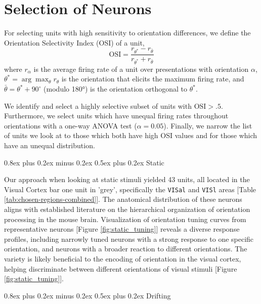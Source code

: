 \documentclass[10pt,twocolumn]{article}
\makeatletter
\renewcommand{\subsection}{\@startsection{subsection}{2}{\z@}%
  {0.8ex plus 0.2ex minus 0.2ex}%
  {0.5ex plus 0.2ex}%
{\normalfont\normalsize\bfseries}}
\makeatother
\begin{document}
\section{Selection of Neurons}

For selecting units with high sensitivity to orientation differences, we define the Orientation Selectivity Index (OSI) of a unit,
\[\textrm{OSI} = \frac{r_{\theta^*} - r_{\bar\theta}}{r_{\theta^*} + r_{\bar\theta}}\]
where $r_\alpha$ is the average firing rate of a unit over presentations with orientation $\alpha$, $\theta^* = \arg\max_\theta r_\theta$ is the orientation that elicits the maximum firing rate, and $\bar{\theta} = \theta^* + 90^\circ$ (modulo 180°) is the orientation orthogonal to $\theta^*$.

We identify and select a highly selective subset of units with \(\textrm{OSI} > .5\).  Furthermore, we select units which have unequal firing rates throughout orientations with a one-way ANOVA test (\(\alpha = 0.05\)).  Finally, we narrow the list of units we look at to those which both have high OSI values and for those which have an unequal distribution.

\subsection{Static}

Our approach when looking at static stimuli yielded 43 units, all located in the Visual Cortex bar one unit in 'grey', specifically the \texttt{VISal} and \texttt{VISl} areas [Table \ref{tab:chosen-regions-combined}].  The anatomical distribution of these neurons aligns with established literature on the hierarchical organization of orientation processing in the mouse brain.
Visualization of orientation tuning curves from representative neurons [Figure \ref{fig:static_tuning}] reveals a diverse response profiles, including narrowly tuned neurons with a strong response to one specific orientation, and neurons with a broader reaction to different orientations.
The variety is likely beneficial to the encoding of orientation in the visual cortex, helping discriminate between different orientations of visual stimuli [Figure \ref{fig:static_tuning}].

\subsection{Drifting}
\end{document}
